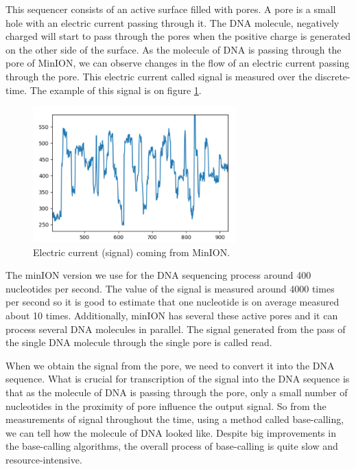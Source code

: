 This sequencer consists of an active surface filled with pores. A pore is a small
hole with an electric current passing through it. The DNA molecule, negatively charged
will start to pass through the pores when the positive charge is generated on the
other side of the surface. As the molecule of DNA is passing through the pore of
MinION, we can observe changes in the flow of an electric current passing through the pore.
This electric current called signal is measured over the discrete-time. The example
of this signal is on figure \ref{obr:minIonCurrent}.

\begin{figure}
\centerline{\includegraphics[width=0.7\textwidth, height=0.3\textheight]{images/signal}}
\caption[MinION signal]{Electric current (signal) coming from MinION.}
\label{obr:minIonCurrent}
\end{figure}

The minION version we use for the DNA sequencing process around 400 nucleotides per second.
The value of the signal is measured around 4000 times per second so it is good to
estimate that one nucleotide is on average measured about 10 times. Additionally,
minION has several these active pores and it can process several DNA molecules in
parallel. The signal generated from the pass of the single DNA molecule through
the single pore is called read.

When we obtain the signal from the pore, we need to convert it into the DNA
sequence. What is crucial for transcription of the signal into the DNA sequence is
that as the molecule of DNA is passing through the pore, only a small
number of nucleotides in the proximity of pore influence the output signal. So from
the measurements of signal throughout the time, using a method called base-calling,
we can tell how the molecule of DNA looked like. Despite big improvements in the
base-calling algorithms, the overall process of base-calling is quite slow and
resource-intensive.

